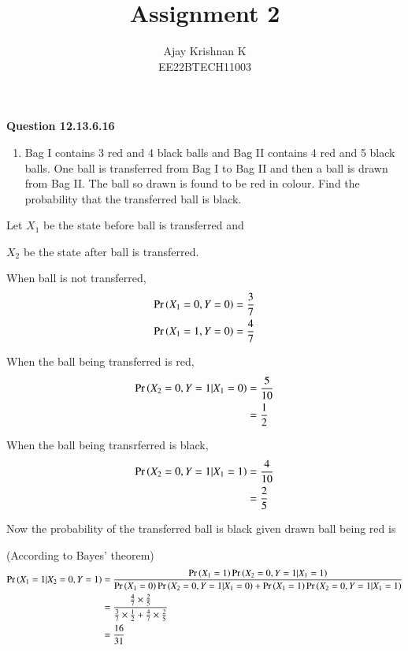 \documentclass[journal,11pt,onecolumn]{IEEEtran}
\begin{document}
\vspace{3cm}
\author{Ajay Krishnan K\\EE22BTECH11003}

\title{Assignment 2}
\maketitle

\textbf{Question 12.13.6.16}
\begin{enumerate}
    \item Bag I contains 3 red and 4 black balls and Bag II contains 4 red and 5 black balls.
          One ball is transferred from Bag I to Bag II and then a ball is drawn from Bag II.
          The ball so drawn is found to be red in colour. Find the probability that the
          transferred ball is black.
\end{enumerate}

\solution


Let $X_1$ be the state before ball is transferred and 

$X_2$ be the state after ball is transferred.

When ball is not transferred,
\begin{align}
    \Pr\left(X_1=0, Y=0\right) & = \frac{3}{7} \\
    \Pr\left(X_1=1, Y=0\right) & = \frac{4}{7}
\end{align}

When the ball being transferred is red,
\begin{align}
    \Pr\left(X_2=0,Y=1\middle|X_1=0\right) & = \frac{5}{10} \\
                                & =\frac{1}{2}
\end{align}

When the ball being transrferred is black,
\begin{align}
    \Pr\left(X_2=0,Y=1\middle|X_1=1\right) & = \frac{4}{10} \\
                                & =\frac{2}{5}
\end{align}

Now the probability of the transferred ball is black given drawn ball being red is


(According to Bayes' theorem)
\begin{align}
    \Pr\left(X_1=1\middle|X_2=0,Y=1\right)
     & = \frac{\Pr\left(X_1=1\right)\Pr\left(X_2=0,Y=1\middle|X_1=1\right)}{\Pr\left(X_1=0\right)\Pr\left(X_2=0,Y=1\middle|X_1=0\right) + \Pr\left(X_1=1\right)\Pr\left(X_2=0,Y=1\middle|X_1=1\right)} \\
     & = \frac{\frac{4}{7} \times \frac{2}{5}}{\frac{3}{7}\times\frac{1}{2}+\frac{4}{7}\times\frac{2}{5}}                   \\
     & = \frac{16}{31}
\end{align}
\end{document}
